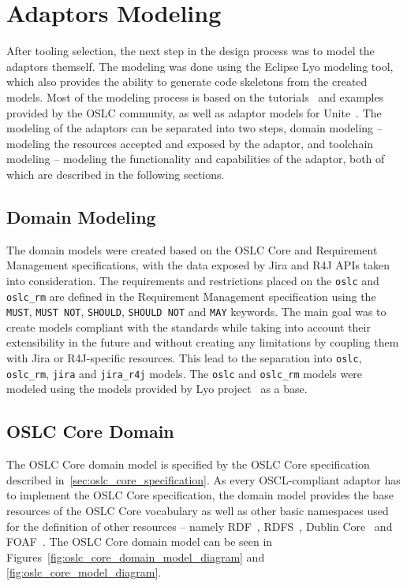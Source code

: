 \section{Adaptors Modeling}
\label{sec:adaptors_modeling}
After tooling selection, the next step in the design process was to model the adaptors themself. The modeling was done using the Eclipse Lyo modeling tool, which also provides the ability to generate code skeletons from the created models. Most of the modeling process is based on the tutorials \cite{oslc_domain_workshop}\cite{oslc_toolchain_workshop}\cite{youtube_lyo_tutorial} and examples \cite{github_oslc_lyo-adaptor-sample-modelling}\cite{github_oslc_bugzilla} provided by the OSLC community, as well as adaptor models for Unite \cite{unite_gitlab}. The modeling of the adaptors can be separated into two steps, domain modeling -- modeling the resources accepted and exposed by the adaptor, and toolchain modeling -- modeling the functionality and capabilities of the adaptor, both of which are described in the following sections.

\subsection{Domain Modeling}
The domain models were created based on the OSLC Core and Requirement Management specifications, with the data exposed by Jira and R4J APIs taken into consideration. The requirements and restrictions placed on the \texttt{oslc} and \texttt{oslc\_rm} are defined in the Requirement Management specification using the \texttt{MUST}, \texttt{MUST NOT}, \texttt{SHOULD}, \texttt{SHOULD NOT} and \texttt{MAY} keywords. The main goal was to create models compliant with the standards while taking into account their extensibility in the future and without creating any limitations by coupling them with Jira or R4J-specific resources. This lead to the separation into \texttt{oslc}, \texttt{oslc\_rm}, \texttt{jira} and \texttt{jira\_r4j} models. The \texttt{oslc} and \texttt{oslc\_rm} models were modeled using the models provided by Lyo project \cite{lyo_domains} as a base.

\subsection*{OSLC Core Domain}
The OSLC Core domain model is specified by the OSLC Core specification described in \ref{sec:oslc_core_specification}. As every OSCL-compliant adaptor has to implement the OSLC Core specification, the domain model provides the base resources of the OSLC Core vocabulary as well as other basic namespaces used for the definition of other resources -- namely RDF \cite{rdf_namespace}, RDFS \cite{rdfs_namespace}, Dublin Core \cite{dcterms_namespace} and FOAF \cite{foaf_namespace}. The OSLC Core domain model can be seen in Figures \ref{fig:oslc_core_domain_model_diagram} and \ref{fig:oslc_core_model_diagram}.

